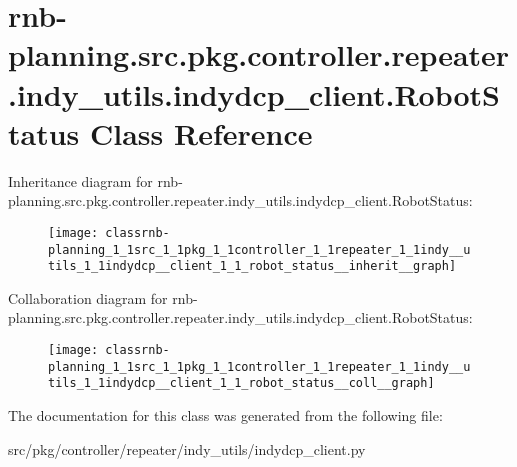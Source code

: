 \hypertarget{classrnb-planning_1_1src_1_1pkg_1_1controller_1_1repeater_1_1indy__utils_1_1indydcp__client_1_1_robot_status}{}\section{rnb-\/planning.src.\+pkg.\+controller.\+repeater.\+indy\+\_\+utils.\+indydcp\+\_\+client.\+Robot\+Status Class Reference}
\label{classrnb-planning_1_1src_1_1pkg_1_1controller_1_1repeater_1_1indy__utils_1_1indydcp__client_1_1_robot_status}


Inheritance diagram for rnb-\/planning.src.\+pkg.\+controller.\+repeater.\+indy\+\_\+utils.\+indydcp\+\_\+client.\+Robot\+Status\+:\nopagebreak
\begin{figure}[H]
\begin{center}
\leavevmode
\texttt{[image: classrnb-planning\_1\_1src\_1\_1pkg\_1\_1controller\_1\_1repeater\_1\_1indy\_\_utils\_1\_1indydcp\_\_client\_1\_1\_robot\_status\_\_inherit\_\_graph]}
\end{center}
\end{figure}


Collaboration diagram for rnb-\/planning.src.\+pkg.\+controller.\+repeater.\+indy\+\_\+utils.\+indydcp\+\_\+client.\+Robot\+Status\+:\nopagebreak
\begin{figure}[H]
\begin{center}
\leavevmode
\texttt{[image: classrnb-planning\_1\_1src\_1\_1pkg\_1\_1controller\_1\_1repeater\_1\_1indy\_\_utils\_1\_1indydcp\_\_client\_1\_1\_robot\_status\_\_coll\_\_graph]}
\end{center}
\end{figure}


The documentation for this class was generated from the following file\+:\begin{DoxyCompactItemize}
\item 
src/pkg/controller/repeater/indy\+\_\+utils/indydcp\+\_\+client.\+py\end{DoxyCompactItemize}
